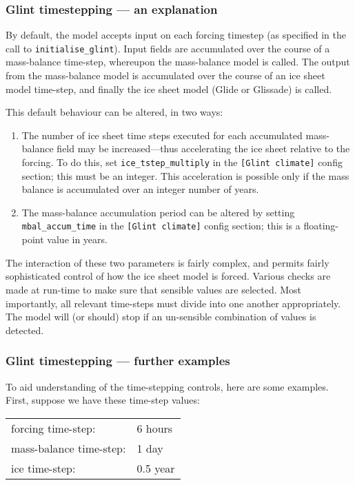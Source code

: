\subsubsection{Glint timestepping --- an explanation}

By default, the model accepts input on each forcing timestep (as specified in 
the call to \texttt{initialise\_glint}). Input fields are accumulated over the course 
of a mass-balance time-step, whereupon the mass-balance model is called. The 
output from the mass-balance model is accumulated over the course of an ice sheet
model time-step, and finally the ice sheet model (Glide or Glissade) is called.

This default behaviour can be altered, in two ways:
\begin{enumerate}
\item The number of ice sheet time steps executed for each accumulated 
mass-balance field may be increased---thus accelerating the ice sheet relative 
to the forcing. To do this, set \texttt{ice\_tstep\_multiply} in the \texttt{[Glint climate]} 
config section; this must be an integer. This acceleration is possible only if the 
mass balance is accumulated over an integer number of years.
\item The mass-balance accumulation period can be altered by setting  
\texttt{mbal\_accum\_time} in the \texttt{[Glint climate]} config section; this is a 
floating-point value in years.
\end{enumerate}
%
The interaction of these two parameters is fairly complex, and permits
fairly sophisticated control of how the ice sheet model is forced. 
Various checks are made at run-time to make sure that sensible values are selected. Most 
importantly, all relevant time-steps must divide into one another 
appropriately. The model will (or should) stop if an un-sensible combination 
of values is detected.

\subsubsection{Glint timestepping --- further examples}

To aid understanding of the time-stepping controls, here are some examples. First, suppose we have these time-step values:

\vspace{0.5cm}
\begin{tabular}{ll}
forcing time-step: & 6 hours \\
mass-balance time-step: & 1 day \\
ice time-step: & 0.5 year
\end{tabular}
\vspace{0.5cm}

